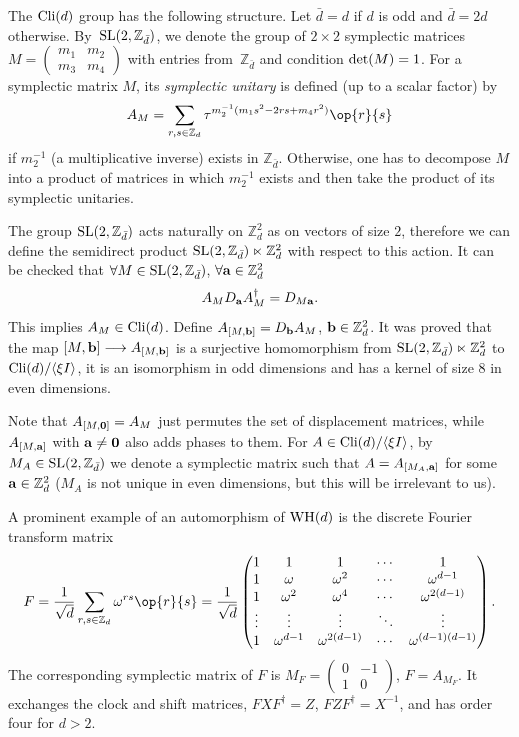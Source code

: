 \documentclass[pdftex]{sigma}
\numberwithin{equation}{section}
\newcommand{\la}{\langle}
\newcommand{\ra}{\rangle}
\newcommand{\mbb}{\mathbb}
\newcommand{\bmp}{\begin{pmatrix}}
\newcommand{\emp}{\end{pmatrix}}
\begin{document}
The ${\rm Cli}(d)$ group has the following structure.
Let $\bar{d} = d$ if $d$ is odd and $\bar{d} = 2d$ otherwise.
By~${\rm SL}(2, \mbb{Z}_{\bar{d}} )$, we denote the group of $2 \times 2$ symplectic matrices
$M = \left(\begin{smallmatrix} m_1 & m_2 \\ m_3 & m_4 \end{smallmatrix}\right)$ with
entries from~$\mbb{Z}_{\bar{d}}$ and condition ${\rm det}(M) = 1$.
For a symplectic matrix $M$,
its \textit{symplectic unitary} is defined (up to a scalar factor) by
\[
A_M = \sum_{r,s \in \mbb{Z}_d}\tau^{m_2^{-1}(m_1 s^2 -2rs + m_4 r^2)} \op{r}{s}
\]
if $m_2^{-1}$ (a multiplicative inverse) exists in $\mbb{Z}_{\bar{d}}$. Otherwise,
one has to decompose $M$ into a product of matrices in which $m_2^{-1}$ exists
and then take the product of its symplectic unitaries.

The group ${\rm SL}(2, \mbb{Z}_{\bar{d}} )$ acts naturally on $\mbb{Z}_d^2$ as
on vectors of size $2$, therefore we can define
the semidirect product ${\rm SL}(2, \mbb{Z}_{\bar{d}}) \ltimes \mbb{Z}_d^2$ with respect to this action.
It can be checked that $\forall M \in {\rm SL}(2, \mbb{Z}_{\bar{d}})$, $\forall {\bf a} \in \mbb{Z}_d^2$
\[
A_M D_{\bf a} A_M^\dag = D_{M{\bf a}}.
\]
This implies $A_M \in {\rm Cli}(d)$.
Define $A_{[M, {\bf b}]} = D_{{\bf b}} A_M$, ${\bf b} \in \mbb{Z}_d^2$.
It was proved \cite[Theorem 1]{Appleby} that the map
$[M, {\bf b}] \longrightarrow A_{[M, {\bf b}]}$
is a surjective homomorphism from
${\rm SL}(2, \mbb{Z}_{\bar{d}}) \ltimes \mbb{Z}_d^2$ to ${\rm Cli}(d) / \la \xi I \ra$,
it is an isomorphism in odd dimensions and has a kernel of size $8$ in even dimensions.

Note that $A_{[M, {\bf 0}]} = A_M$ just permutes the set of displacement matrices,
while $A_{[M, {\bf a}]}$ with ${\bf a} \neq {\bf 0}$ also adds phases to them.
For $A \in {\rm Cli}(d)/ \la \xi I \ra$, by
$M_A \in {\rm SL}(2, \mbb{Z}_{\bar{d}})$ we denote
a symplectic matrix such that $A = A_{[M_A, {\bf a}]}$
for some ${\bf a} \in \mbb{Z}_d^2$ ($M_A$ is not unique in even dimensions,
but this will be irrelevant to us).

A prominent example of an automorphism of ${\rm WH}(d)$ is the discrete Fourier transform matrix
\[
F = \frac{1}{\sqrt{d}}\sum_{r,s \in \mbb{Z}_d}\omega^{rs} \op{r}{s} = \frac{1}{\sqrt{d}}\bmp
1 & 1 & 1 & \cdots & 1\\
1 & \omega & \omega^2 & \cdots & \omega^{d-1}\\
1 & \omega^2 & \omega^4 & \cdots & \omega^{2(d-1)}\\
\vdots & \vdots & \vdots & \ddots & \vdots\\
1 & \omega^{d-1} & \omega^{2(d-1)} & \cdots & \omega^{(d-1)(d-1)}\\
\emp.
\]
The corresponding symplectic matrix of $F$ is
$M_F = \left(\begin{smallmatrix} 0 & -1 \\ 1 & 0 \end{smallmatrix}\right)$, $F = A_{M_F}$.
It exchanges the clock and shift matrices,
$FXF^\dag = Z$, $FZF^\dag = X^{-1}$, and has order four for $d>2$.
\end{document}
